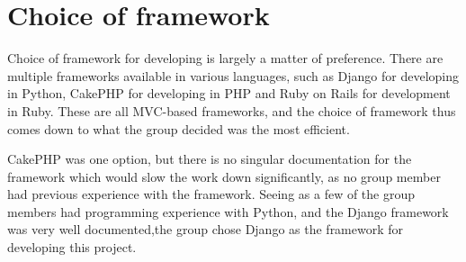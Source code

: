 \section{Choice of framework}

Choice of framework for developing is largely a matter of preference. There 
are multiple frameworks available in various languages, such as 
Django\cite{djangoproject11}  for developing in Python, CakePHP\cite{cake11} 
for developing in PHP and Ruby on Rails\cite{ruby11} for development in Ruby. 
These are all MVC-based frameworks, and the choice of framework thus comes 
down to what the group decided was the most efficient.

CakePHP was one option, but there is no singular documentation for the 
framework which would slow the work down significantly, as no group member 
had previous experience with the framework. Seeing as a few of the group 
members had programming experience with Python, and the Django framework 
was very well documented,the group chose Django as the framework for 
developing this project.


